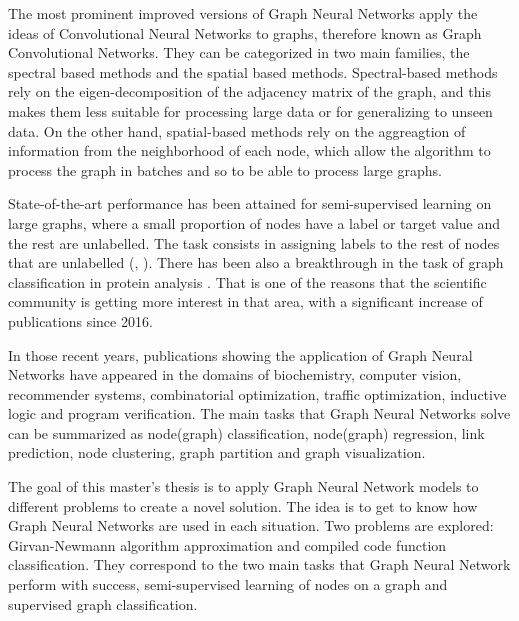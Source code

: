 The most prominent improved versions of Graph Neural Networks apply the ideas of Convolutional Neural Networks to graphs, therefore known as Graph Convolutional Networks. They can be categorized in two main families, the spectral based methods and the spatial based methods. Spectral-based methods rely on the eigen-decomposition of the adjacency matrix of the graph, and this makes them less suitable for processing large data or for generalizing to unseen data. On the other hand, spatial-based methods rely on the aggreagtion of information from the neighborhood of each node, which allow the algorithm to process the graph in batches and so to be able to process large graphs.



State-of-the-art performance has been attained for semi-supervised learning on large graphs, where a small proportion of nodes have a label or target value and the rest are unlabelled. The task consists in assigning labels to the rest of nodes that are unlabelled (\cite{gcn}, \cite{graphsage}). There has been also a breakthrough in the task of graph classification in protein analysis \cite{q9}. That is one of the reasons that the scientific community is getting more interest in that area, with a significant increase of publications since 2016.

In those recent years, publications showing the application of Graph Neural Networks have appeared in the domains of biochemistry, computer vision, recommender systems, combinatorial optimization, traffic optimization, inductive logic and program verification. The main tasks that Graph Neural Networks solve can be summarized as node(graph) classification, node(graph) regression, link prediction,  node clustering, graph partition and graph visualization.

	

The goal of this master's thesis is to apply Graph Neural Network models to different problems to create a novel solution. The idea is to get to know how Graph Neural Networks are used in each situation. Two problems are explored: Girvan-Newmann algorithm approximation and compiled code function classification. They correspond to the two main tasks that Graph Neural Network perform with success, semi-supervised learning of nodes on a graph and supervised graph classification. 



